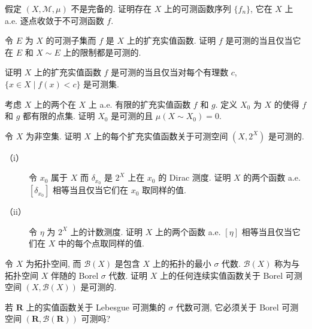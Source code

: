 \documentclass[../../main.tex]{subfiles}
\begin{document}
\begin{exercise}\label{exercise:ch18-03}
假定 $(X,\mathcal{M},\mu)$ 不是完备的. 证明存在 $X$ 上的可测函数序列 $\{f_{n}\}$, 它在 $X$ 上 a.e. 逐点收敛于不可测函数 $f$.
\end{exercise}

\begin{exercise}\label{exercise:ch18-04}
令 $E$ 为 $X$ 的可测子集而 $f$ 是 $X$ 上的扩充实值函数. 证明 $f$ 是可测的当且仅当它在 $E$ 和 $X\sim E$ 上的限制都是可测的.
\end{exercise}

\begin{exercise}\label{exercise:ch18-05}
证明 $X$ 上的扩充实值函数 $f$ 是可测的当且仅当对每个有理数 $c$, $\{x\in X\mid f(x)<c\}$ 是可测集.
\end{exercise}

\begin{exercise}\label{exercise:ch18-06}
考虑 $X$ 上的两个在 $X$ 上 a.e. 有限的扩充实值函数 $f$ 和 $g$. 定义 $X_{0}$ 为 $X$ 的使得 $f$ 和 $g$ 都有限的点集. 证明 $X_{0}$ 是可测的且 $\mu(X\sim X_{0})=0$.
\end{exercise}

\begin{exercise}\label{exercise:ch18-07}
令 $X$ 为非空集. 证明 $X$ 上的每个扩充实值函数关于可测空间 $(X,2^{X})$ 是可测的.
\begin{description}
\item[（i）] 令 $x_{0}$ 属于 $X$ 而 $\delta_{x_{0}}$ 是 $2^{X}$ 上在 $x_{0}$ 的 Dirac 测度. 证明 $X$ 的两个函数 a.e. $[\delta_{x_{0}}]$ 相等当且仅当它们在 $x_{0}$ 取同样的值.
\item[（ii）] 令 $\eta$ 为 $2^{X}$ 上的计数测度. 证明 $X$ 上的两个函数 a.e. $[\eta]$ 相等当且仅当它们在 $X$ 中的每个点取同样的值.
\end{description}
\end{exercise}

\begin{exercise}\label{exercise:ch18-08}
令 $X$ 为拓扑空间, 而 $\mathcal{B}(X)$ 是包含 $X$ 上的拓扑的最小 $\sigma$ 代数. $\mathcal{B}(X)$ 称为与拓扑空间 $X$ 伴随的 Borel $\sigma$ 代数. 证明 $X$ 上的任何连续实值函数关于 Borel 可测空间 $(X,\mathcal{B}(X))$ 是可测的.
\end{exercise}

\begin{exercise}\label{exercise:ch18-09}
若 $\mathbf{R}$ 上的实值函数关于 Lebesgue 可测集的 $\sigma$ 代数可测, 它必须关于 Borel 可测空间 $(\mathbf{R},\mathcal{B}(\mathbf{R}))$ 可测吗?
\end{exercise}
\end{document}
